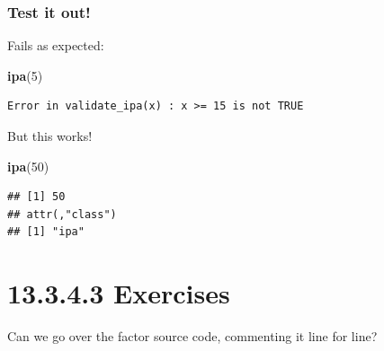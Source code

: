 \documentclass[]{book}
\newenvironment{Shaded}{\begin{snugshade}}{\end{snugshade}}
\newcommand{\DecValTok}[1]{\textcolor[rgb]{0.00,0.00,0.81}{#1}}
\newcommand{\KeywordTok}[1]{\textcolor[rgb]{0.13,0.29,0.53}{\textbf{#1}}}
\newcommand{\NormalTok}[1]{#1}
\begin{document}
\hypertarget{test-it-out}{%
\subsubsection{Test it out!}\label{test-it-out}}

Fails as expected:

\begin{Shaded}
\begin{Highlighting}[]
\KeywordTok{ipa}\NormalTok{(}\DecValTok{5}\NormalTok{)}
\end{Highlighting}
\end{Shaded}

\begin{verbatim}
Error in validate_ipa(x) : x >= 15 is not TRUE
\end{verbatim}

But this works!

\begin{Shaded}
\begin{Highlighting}[]
\KeywordTok{ipa}\NormalTok{(}\DecValTok{50}\NormalTok{)}
\end{Highlighting}
\end{Shaded}

\begin{verbatim}
## [1] 50
## attr(,"class")
## [1] "ipa"
\end{verbatim}

\hypertarget{exercises-10}{%
\section*{13.3.4.3 Exercises}\label{exercises-10}}

Can we go over the factor source code, commenting it line for line?
\end{document}
